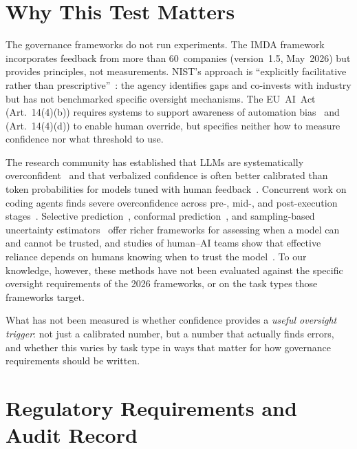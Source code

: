 \documentclass[10pt,twocolumn]{article}
\begin{document}
\section{Why This Test Matters}

The governance frameworks do not run experiments. The IMDA
framework~\citep{imda2026} incorporates feedback from more than 60~companies
(version~1.5, May~2026) but provides principles, not measurements. NIST's
approach is ``explicitly facilitative rather than
prescriptive''~\citep{csa2026nist}: the agency identifies gaps and co-invests
with industry but has not benchmarked specific oversight mechanisms. The
EU~AI~Act (Art.~14(4)(b)) requires systems to support awareness of automation
bias~\citep{parasuraman2010} and (Art.~14(4)(d)) to enable human override, but
specifies neither how to measure confidence nor what threshold to use.

The research community has established that LLMs are systematically
overconfident~\citep{guo2017,tian2023,xiong2024} and that verbalized confidence
is often better calibrated than token probabilities for models tuned with
human feedback~\citep{ouyang2022,tian2023,kadavath2022}. Concurrent work on
coding agents finds severe overconfidence across pre-, mid-, and post-execution
stages~\citep{kaddour2026}. Selective
prediction~\citep{geifman2017}, conformal prediction~\citep{vovk2005}, and
sampling-based uncertainty estimators~\citep{manakul2023,kuhn2023} offer richer
frameworks for assessing when a model can and cannot be trusted, and studies of
human--AI teams show that effective reliance depends on humans knowing when to
trust the model~\citep{bansal2021}. To our knowledge, however, these methods
have not been evaluated against the specific oversight requirements of the 2026
frameworks, or on the task types those frameworks target.

What has not been measured is whether confidence provides a \emph{useful
oversight trigger}: not just a calibrated number, but a number that actually
finds errors, and whether this varies by task type in ways that matter for
how governance requirements should be written.

\section{Regulatory Requirements and Audit Record}
\end{document}
